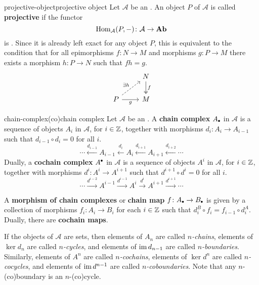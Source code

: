 \begin{topic}{projective-object}{projective object}
    Let $\mathcal{A}$ be an . An object $P$ of $\mathcal{A}$ is called \textbf{projective} if the functor
    \[ \operatorname{Hom}_\mathcal{A}(P, -) \colon \mathcal{A} \to \textbf{Ab} \]
    is . Since it is already left exact for any object $P$, this is equivalent to the condition that for all epimorphisms $f \colon N \to M$ and morphisms $g \colon P \to M$ there exists a morphism $h \colon P \to N$ such that $fh = g$.
    \[ \svg \begin{tikzcd} & N \arrow[twoheadrightarrow]{d}{f} \\ P \arrow[swap]{r}{g} \arrow[dashed]{ur}{\exists h} & M \end{tikzcd} \]
\end{topic}

\begin{topic}{chain-complex}{(co)chain complex}
    Let $\mathcal{A}$ be an . A \textbf{chain complex} $A_\bdot$ in $\mathcal{A}$ is a sequence of objects $A_i$ in $\mathcal{A}$, for $i \in \mathbb{Z}$, together with morphisms $d_i \colon A_i \to A_{i - 1}$ such that $d_{i - 1} \circ d_i = 0$ for all $i$.
    \[ \cdots \xleftarrow{d_{i - 1}} A_{i - 1} \xleftarrow{d_i} A_i \xleftarrow{d_{i + 1}} A_{i + 1} \xleftarrow{d_{i + 2}} \cdots \]
    Dually, a \textbf{cochain complex} $A^\bdot$ in $\mathcal{A}$ is a sequence of objects $A^i$ in $\mathcal{A}$, for $i \in \mathbb{Z}$, together with morphisms $d^i \colon A^i \to A^{i + 1}$ such that $d^{i + 1} \circ d^i = 0$ for all $i$.
    \[ \cdots \xrightarrow{d^{i - 2}} A^{i - 1} \xrightarrow{d^{i - 1}} A^i \xrightarrow{d^i} A^{i + 1} \xrightarrow{d^{i + 1}} \cdots \]
    
    A \textbf{morphism of chain complexes} or \textbf{chain map} $f \colon A_\bdot \to B_\bdot$ is given by a collection of morphisms $f_i \colon A_i \to B_i$ for each $i \in \mathbb{Z}$ such that $d^B_i \circ f_i = f_{i - 1} \circ d^A_i$. Dually, there are \textbf{cochain maps}.
    
    If the objects of $\mathcal{A}$ are sets, then elements of $A_n$ are called \textit{$n$-chains}, elements of $\ker d_n$ are called \textit{$n$-cycles}, and elements of $\operatorname{im} d_{n - 1}$ are called \textit{$n$-boundaries}. Similarly, elements of $A^n$ are called \textit{$n$-cochains}, elements of $\ker d^n$ are called \textit{$n$-cocycles}, and elements of $\operatorname{im} d^{n - 1}$ are called \textit{$n$-coboundaries}. Note that any $n$-(co)boundary is an $n$-(co)cycle.
\end{topic}

